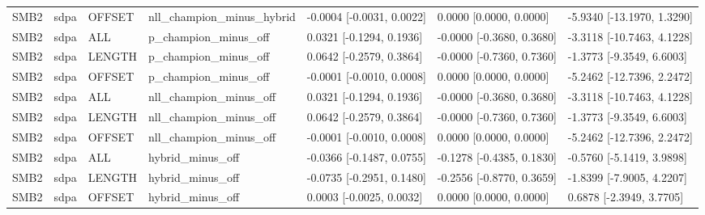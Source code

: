 \begin{tabular}{lllllll}
SMB2 & sdpa & OFFSET & nll\_champion\_minus\_hybrid & -0.0004 [-0.0031, 0.0022] & 0.0000 [0.0000, 0.0000] & -5.9340 [-13.1970, 1.3290] \\
SMB2 & sdpa & ALL & p\_champion\_minus\_off & 0.0321 [-0.1294, 0.1936] & -0.0000 [-0.3680, 0.3680] & -3.3118 [-10.7463, 4.1228] \\
SMB2 & sdpa & LENGTH & p\_champion\_minus\_off & 0.0642 [-0.2579, 0.3864] & -0.0000 [-0.7360, 0.7360] & -1.3773 [-9.3549, 6.6003] \\
SMB2 & sdpa & OFFSET & p\_champion\_minus\_off & -0.0001 [-0.0010, 0.0008] & 0.0000 [0.0000, 0.0000] & -5.2462 [-12.7396, 2.2472] \\
SMB2 & sdpa & ALL & nll\_champion\_minus\_off & 0.0321 [-0.1294, 0.1936] & -0.0000 [-0.3680, 0.3680] & -3.3118 [-10.7463, 4.1228] \\
SMB2 & sdpa & LENGTH & nll\_champion\_minus\_off & 0.0642 [-0.2579, 0.3864] & -0.0000 [-0.7360, 0.7360] & -1.3773 [-9.3549, 6.6003] \\
SMB2 & sdpa & OFFSET & nll\_champion\_minus\_off & -0.0001 [-0.0010, 0.0008] & 0.0000 [0.0000, 0.0000] & -5.2462 [-12.7396, 2.2472] \\
SMB2 & sdpa & ALL & hybrid\_minus\_off & -0.0366 [-0.1487, 0.0755] & -0.1278 [-0.4385, 0.1830] & -0.5760 [-5.1419, 3.9898] \\
SMB2 & sdpa & LENGTH & hybrid\_minus\_off & -0.0735 [-0.2951, 0.1480] & -0.2556 [-0.8770, 0.3659] & -1.8399 [-7.9005, 4.2207] \\
SMB2 & sdpa & OFFSET & hybrid\_minus\_off & 0.0003 [-0.0025, 0.0032] & 0.0000 [0.0000, 0.0000] & 0.6878 [-2.3949, 3.7705] \\
\hline
\end{tabular}
